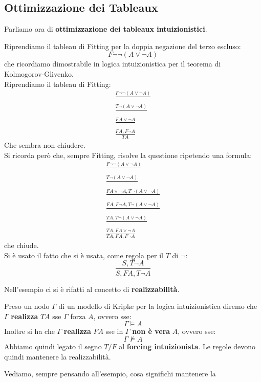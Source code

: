 \documentclass[a4paper,12pt, oneside]{book}
\begin{document}
\subsection{Ottimizzazione dei Tableaux}
Parliamo ora di \textbf{ottimizzazione dei tableaux intuizionistici}.
\begin{esempio}
  Riprendiamo il tableau di Fitting per la doppia negazione del terzo escluso:
  \[F\neg \neg (A\lor \neg A)\]
  che ricordiamo dimostrabile in logica intuizionistica per il teorema di
  Kolmogorov-Glivenko. \\
  Riprendiamo il tableau di Fitting:
  \begin{gather*}
    \frac{F\neg \neg (A\lor \neg A)}{}\\
    \frac{T\neg(A\lor \neg A)}{}\\
    \frac{FA\lor \neg A}{}\\
    \frac{FA,F\neg A}{TA}
  \end{gather*}
  Che sembra non chiudere. \\
  Si ricorda però che, sempre Fitting, risolve la questione ripetendo una
  formula: 
  \begin{gather*}
    \frac{F\neg \neg (A\lor \neg A)}{}\\
    \frac{T\neg(A\lor \neg A)}{}\\
    \frac{FA\lor \neg A, T\neg(A\lor \neg A)}{}\\
    \frac{FA,F\neg A,T\neg(A\lor \neg A)}{}\\
    \frac{TA,T\neg(A\lor \neg A)}{}\\
    \frac{TA, FA\lor \neg A}{TA, FA, F\neg A}
  \end{gather*}
  che chiude.\\
  Si è usato il fatto che si è usata, come regola per il $T$ di $\neg$:
  \[\frac{S, T\neg A}{S, FA, T\neg A}\]
\end{esempio}
Nell'esempio ci si è rifatti al concetto di \textbf{realizzabilità}.
\begin{definizione}
  Preso un nodo $\Gamma$ di un modello di Kripke per la logica intuizionistica
  diremo che $\Gamma$ \textbf{realizza} $TA$ sse $\Gamma$ \textup{forza} $A$,
  ovvero sse: 
  \[\Gamma\vDash A\]
  Inoltre si ha che $\Gamma$ \textbf{realizza} $FA$ sse in $\Gamma$ \textbf{non
    è vera} $A$, ovvero sse:
  \[\Gamma\nvDash A\]
  Abbiamo quindi legato il segno $T/F$ al \textbf{forcing intuizionista}. Le
  regole devono quindi mantenere la realizzabilità.
\end{definizione}
Vediamo, sempre pensando all'esempio, cosa significhi mantenere la
\end{document}
